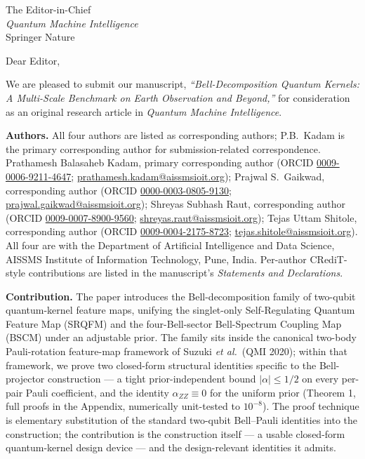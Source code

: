 \documentclass[11pt]{letter}
\begin{document}
\begin{letter}{The Editor-in-Chief\\
\emph{Quantum Machine Intelligence}\\
Springer Nature}

\opening{Dear Editor,}

We are pleased to submit our manuscript, \emph{``Bell-Decomposition Quantum Kernels: A Multi-Scale Benchmark on Earth Observation and Beyond,''} for consideration as an original research article in \emph{Quantum Machine Intelligence}.

\medskip
\textbf{Authors.}
All four authors are listed as corresponding authors; P.B.\ Kadam is the primary corresponding author for submission-related correspondence.
Prathamesh Balasaheb Kadam, primary corresponding author
(ORCID \href{https://orcid.org/0009-0006-9211-4647}{0009-0006-9211-4647};
\href{mailto:prathamesh.kadam@aissmsioit.org}{prathamesh.kadam@aissmsioit.org});
Prajwal S.\ Gaikwad, corresponding author
(ORCID \href{https://orcid.org/0000-0003-0805-9130}{0000-0003-0805-9130};
\href{mailto:prajwal.gaikwad@aissmsioit.org}{prajwal.gaikwad@aissmsioit.org});
Shreyas Subhash Raut, corresponding author
(ORCID \href{https://orcid.org/0009-0007-8900-9560}{0009-0007-8900-9560};
\href{mailto:shreyas.raut@aissmsioit.org}{shreyas.raut@aissmsioit.org});
Tejas Uttam Shitole, corresponding author
(ORCID \href{https://orcid.org/0009-0004-2175-8723}{0009-0004-2175-8723};
\href{mailto:tejas.shitole@aissmsioit.org}{tejas.shitole@aissmsioit.org}).
All four are with the Department of Artificial Intelligence and Data Science, AISSMS Institute of Information Technology, Pune, India.  Per-author CRediT-style contributions are listed in the manuscript's \emph{Statements and Declarations}.

\medskip
\textbf{Contribution.}
The paper introduces the Bell-decomposition family of two-qubit quantum-kernel feature maps, unifying the singlet-only Self-Regulating Quantum Feature Map (SRQFM) and the four-Bell-sector Bell-Spectrum Coupling Map (BSCM) under an adjustable prior.  The family sits inside the canonical two-body Pauli-rotation feature-map framework of Suzuki \emph{et al.}\ (QMI 2020); within that framework, we prove two closed-form structural identities specific to the Bell-projector construction --- a tight prior-independent bound $|\alpha|\le 1/2$ on every per-pair Pauli coefficient, and the identity $\alpha_{ZZ}\equiv 0$ for the uniform prior (Theorem 1, full proofs in the Appendix, numerically unit-tested to $10^{-8}$).  The proof technique is elementary substitution of the standard two-qubit Bell--Pauli identities into the construction; the contribution is the construction itself --- a usable closed-form quantum-kernel design device --- and the design-relevant identities it admits.


\end{letter}
\end{document}
